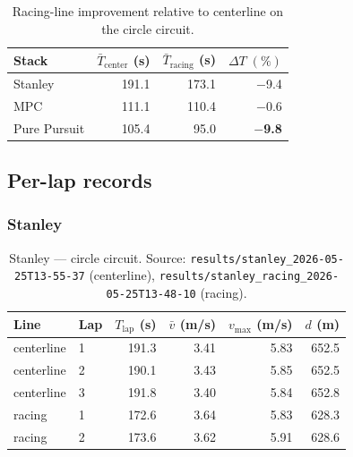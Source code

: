 \documentclass[11pt,a4paper]{article}
\newcommand{\runref}[1]{\texttt{results/#1}}
\newcommand{\best}[1]{\textbf{#1}}
\begin{document}
\begin{table}[H]
  \centering
  \caption{Racing-line improvement relative to centerline on the circle circuit.}
  \label{tab:circle-speedup}
  \begin{tabular}{@{}lrrr@{}}
    \toprule
    Stack & $\bar{T}_{\mathrm{center}}$ (s) & $\bar{T}_{\mathrm{racing}}$ (s) &
    $\Delta T\;(\%)$ \\
    \midrule
    Stanley      & 191.1 & 173.1 & $-$9.4 \\
    MPC          & 111.1 & 110.4 & $-$0.6 \\
    Pure Pursuit & 105.4 &  95.0 & \best{$-$9.8} \\
    \bottomrule
  \end{tabular}
\end{table}

\subsection{Per-lap records}

\subsubsection{Stanley}
\begin{table}[H]
  \centering
  \caption{Stanley --- circle circuit.
           Source: \runref{stanley\_2026-05-25T13-55-37} (centerline),
           \runref{stanley\_racing\_2026-05-25T13-48-10} (racing).}
  \label{tab:stanley-laps}
  \small
  \begin{tabular}{@{}llrrrr@{}}
    \toprule
    Line & Lap & $T_{\mathrm{lap}}$ (s) & $\bar{v}$ (m/s) & $v_{\max}$ (m/s) & $d$ (m) \\
    \midrule
    centerline & 1 & 191.3 & 3.41 & 5.83 & 652.5 \\
    centerline & 2 & 190.1 & 3.43 & 5.85 & 652.5 \\
    centerline & 3 & 191.8 & 3.40 & 5.84 & 652.8 \\
    \addlinespace
    racing     & 1 & 172.6 & 3.64 & 5.83 & 628.3 \\
    racing     & 2 & 173.6 & 3.62 & 5.91 & 628.6 \\
    \bottomrule
  \end{tabular}
\end{table}
\end{document}
